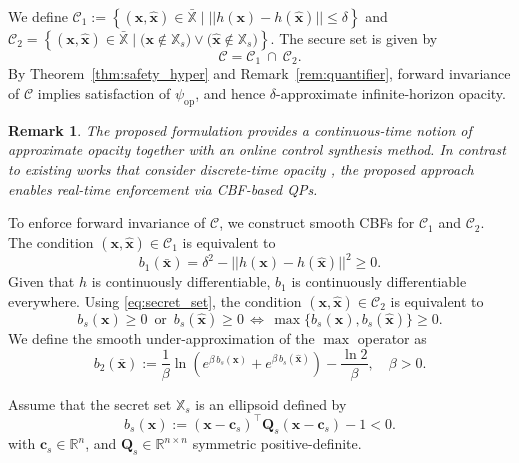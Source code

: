 \documentclass[letterpaper, 10 pt, conference]{ieeeconf}  %
\newtheorem{remark}{Remark}
\begin{document}
We define $\mathcal{C}_1 := \left\{ (\mathbf{x}, \hat{\mathbf{x}}) \in \bar{\mathbb{X}} \mid || h(\mathbf{x}) - h(\hat{\mathbf{x}})|| \leq \delta \right\}$ and $\mathcal{C}_2 = \left\{ (\mathbf{x}, \hat{\mathbf{x}}) \in \bar{\mathbb{X}} \mid \big( \mathbf{x} \notin \mathbb{X}_s \big) \lor \big( \hat{\mathbf{x}} \notin \mathbb{X}_s \big) \right\}$. The secure set is given by
\begin{equation} \label{eq:secure_set}
    \mathcal{C} = \mathcal{C}_1 \ \cap \ \mathcal{C}_2.
\end{equation} 
By Theorem~\ref{thm:safety_hyper} and Remark~\ref{rem:quantifier}, forward invariance of $\mathcal{C}$ implies satisfaction of $\psi_\text{op}$, and hence $\delta$-approximate infinite-horizon opacity.
\begin{remark}
    The proposed formulation provides a continuous-time notion of approximate opacity together with an online control synthesis method. In contrast to existing works that consider discrete-time opacity \cite{yin2021, anand2024, zhong2025}, the proposed approach enables real-time enforcement via CBF-based QPs.
\end{remark}

To enforce forward invariance of $\mathcal{C}$, we construct smooth CBFs for $\mathcal{C}_1$ and $\mathcal{C}_2$. The condition $(\mathbf{x},\hat{\mathbf{x}}) \in \mathcal{C}_1$ 
is equivalent to
\begin{equation} \label{eq:delta_cbf}
    b_1(\bar{\mathbf{x}}) = \delta^2 - ||h(\mathbf{x}) - h(\hat{\mathbf{x}}) ||^2 \ge 0.
\end{equation}
Given that $h$ is continuously differentiable, $b_1$ is continuously differentiable everywhere. Using \eqref{eq:secret_set}, the condition $(\mathbf{x},\hat{\mathbf{x}}) \in \mathcal{C}_2$ 
is equivalent to 
\begin{equation} \label{eq:max}
    b_s(\mathbf{x}) \ge 0 \, \text{ or } \, b_s(\hat{\mathbf{x}}) \ge 0 \, \Leftrightarrow \, \max \{ b_s(\mathbf{x}), b_s(\hat{\mathbf{x}}) \} \ge 0.
\end{equation}
We define the smooth under-approximation of the $\max$ operator as
\begin{equation} \label{eq:lse_cbf}
    b_2(\bar{\mathbf{x}}) := \frac{1}{\beta} \ln \left( e^{\beta \, b_s(\mathbf{x})} + e^{\beta \, b_s(\hat{\mathbf{x}})} \right) - \frac{\ln 2}{\beta}, \quad \beta > 0.
\end{equation}

Assume that the secret set $\mathbb{X}_s$ is an ellipsoid defined by
\begin{equation} \label{eq:ellipsoid}
    b_s(\mathbf{x}) := (\mathbf{x} - \mathbf{c}_s)^\top \mathbf{Q}_s (\mathbf{x} - \mathbf{c}_s) - 1 < 0.
\end{equation}
with $\mathbf{c}_s \in \mathbb{R}^n$, and $\mathbf{Q}_s \in \mathbb{R}^{n \times n}$ symmetric positive-definite.
\end{document}
